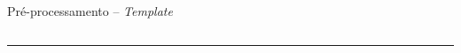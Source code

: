 \begin{frame}{Pré-processamento -- \emph{Template}}
\begin{columns}
    \end{columns}
    \rule{\textwidth}{1pt}
    \vskip20pt
    \begin{columns}
    \end{columns}
\end{frame}

